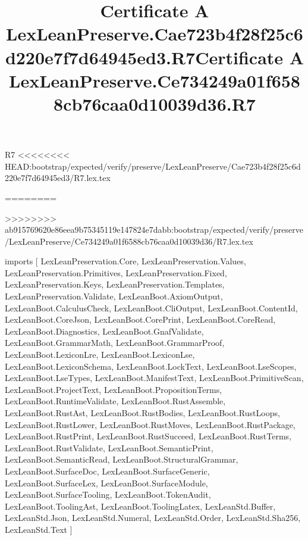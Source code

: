 \begin{lexlean}{R7}
<<<<<<<< HEAD:bootstrap/expected/verify/preserve/LexLeanPreserve/Cae723b4f28f25c6d220e7f7d64945ed3/R7.lex.tex
\title{Certificate A LexLeanPreserve.Cae723b4f28f25c6d220e7f7d64945ed3.R7}
========
\title{Certificate A LexLeanPreserve.Ce734249a01f6588cb76caa0d10039d36.R7}
>>>>>>>> ab915769620e86eea9b75345119e147824e7dabb:bootstrap/expected/verify/preserve/LexLeanPreserve/Ce734249a01f6588cb76caa0d10039d36/R7.lex.tex
\begin{coremodule}
imports [
  LexLeanPreservation.Core,
  LexLeanPreservation.Values,
  LexLeanPreservation.Primitives,
  LexLeanPreservation.Fixed,
  LexLeanPreservation.Keys,
  LexLeanPreservation.Templates,
  LexLeanPreservation.Validate,
  LexLeanBoot.AxiomOutput,
  LexLeanBoot.CalculusCheck,
  LexLeanBoot.CliOutput,
  LexLeanBoot.ContentId,
  LexLeanBoot.CoreJson,
  LexLeanBoot.CorePrint,
  LexLeanBoot.CoreRead,
  LexLeanBoot.Diagnostics,
  LexLeanBoot.GnafValidate,
  LexLeanBoot.GrammarMath,
  LexLeanBoot.GrammarProof,
  LexLeanBoot.LexiconLre,
  LexLeanBoot.LexiconLse,
  LexLeanBoot.LexiconSchema,
  LexLeanBoot.LockText,
  LexLeanBoot.LseScopes,
  LexLeanBoot.LseTypes,
  LexLeanBoot.ManifestText,
  LexLeanBoot.PrimitiveScan,
  LexLeanBoot.ProjectText,
  LexLeanBoot.PropositionTerms,
  LexLeanBoot.RuntimeValidate,
  LexLeanBoot.RustAssemble,
  LexLeanBoot.RustAst,
  LexLeanBoot.RustBodies,
  LexLeanBoot.RustLoops,
  LexLeanBoot.RustLower,
  LexLeanBoot.RustMoves,
  LexLeanBoot.RustPackage,
  LexLeanBoot.RustPrint,
  LexLeanBoot.RustSucceed,
  LexLeanBoot.RustTerms,
  LexLeanBoot.RustValidate,
  LexLeanBoot.SemanticPrint,
  LexLeanBoot.SemanticRead,
  LexLeanBoot.StructuralGrammar,
  LexLeanBoot.SurfaceDoc,
  LexLeanBoot.SurfaceGeneric,
  LexLeanBoot.SurfaceLex,
  LexLeanBoot.SurfaceModule,
  LexLeanBoot.SurfaceTooling,
  LexLeanBoot.TokenAudit,
  LexLeanBoot.ToolingAst,
  LexLeanBoot.ToolingLatex,
  LexLeanStd.Buffer,
  LexLeanStd.Json,
  LexLeanStd.Numeral,
  LexLeanStd.Order,
  LexLeanStd.Sha256,
  LexLeanStd.Text
]


\end{coremodule}
\end{lexlean}
